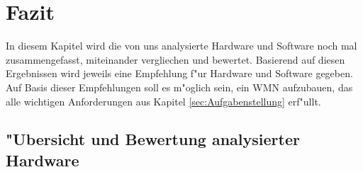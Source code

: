 \section{Fazit}

In diesem Kapitel wird die von uns analysierte Hardware und Software noch
mal zusammengefasst, miteinander vergliechen und bewertet. Basierend
auf diesen Ergebnissen wird jeweils eine Empfehlung f"ur Hardware und
Software gegeben. Auf Basis dieser Empfehlungen soll es m"oglich sein,
ein WMN aufzubauen, das alle wichtigen Anforderungen aus Kapitel
\ref{sec:Aufgabenstellung} erf"ullt.

\subsection{"Ubersicht und Bewertung analysierter Hardware}

